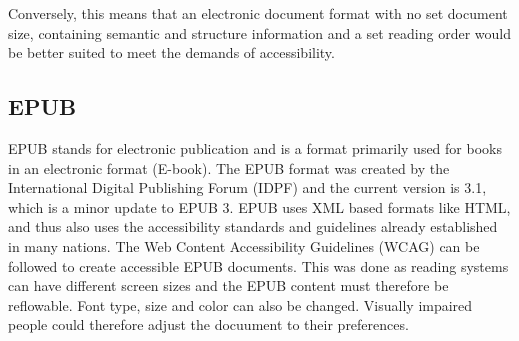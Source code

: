 Conversely, this means that an electronic document format with no set document size, containing semantic and structure information and a set reading order would be better suited to meet the demands of accessibility. 

\subsection{EPUB}
EPUB stands for electronic publication and is a format primarily used for books in an electronic format (E-book). The EPUB format was created by the International Digital Publishing Forum (IDPF) and the current version is 3.1, which is a minor update to EPUB 3. EPUB uses XML based formats like HTML, and thus also uses the accessibility standards and guidelines already established in many nations. The Web Content Accessibility Guidelines (WCAG) can be followed to create accessible EPUB documents. This was done as reading systems can have different screen sizes and the EPUB content must therefore be reflowable. Font type, size and color can also be changed. Visually impaired people could therefore adjust the docuument to their preferences.